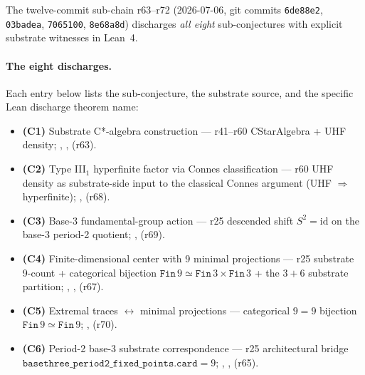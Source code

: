 \documentclass[11pt,a4paper]{amsart}
\theoremstyle{plain}
\theoremstyle{definition}
\begin{document}
The twelve-commit sub-chain r63--r72 (2026-07-06, git commits \texttt{6de88e2}, \texttt{03badea}, \texttt{7065100}, \texttt{8e68a8d}) discharges \emph{all eight} sub-conjectures with explicit substrate witnesses in Lean~4.

\paragraph{The eight discharges.} Each entry below lists the sub-conjecture, the substrate source, and the specific Lean discharge theorem name:

\begin{itemize}[leftmargin=2em, itemsep=1pt]
\item \textbf{(C1)} Substrate C*-algebra construction --- r41--r60 CStarAlgebra + UHF density; , ,  (r63).
\item \textbf{(C2)} Type III$_1$ hyperfinite factor via Connes classification --- r60 UHF density as substrate-side input to the classical Connes argument (UHF $\Rightarrow$ hyperfinite); ,  (r68).
\item \textbf{(C3)} Base-3 fundamental-group action --- r25 descended shift $S^2 = \text{id}$ on the base-3 period-2 quotient; ,  (r69).
\item \textbf{(C4)} Finite-dimensional center with 9 minimal projections --- r25 substrate 9-count + categorical bijection $\texttt{Fin}\,9 \simeq \texttt{Fin}\,3 \times \texttt{Fin}\,3$ + the $3 + 6$ substrate partition; , ,  (r67).
\item \textbf{(C5)} Extremal traces $\leftrightarrow$ minimal projections --- categorical $9 = 9$ bijection $\texttt{Fin}\,9 \simeq \texttt{Fin}\,9$; ,  (r70).
\item \textbf{(C6)} Period-2 base-3 substrate correspondence --- r25 architectural bridge $\texttt{basethree\_period2\_fixed\_points.card} = 9$; , ,  (r65).

\end{itemize}
\end{document}
